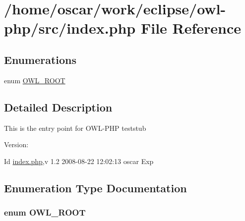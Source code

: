 \hypertarget{index_8php}{
\section{/home/oscar/work/eclipse/owl-php/src/index.php File Reference}
\label{index_8php}
}
\subsection*{Enumerations}
\begin{CompactItemize}
\item 
enum \hyperlink{index_8php_35612f9a6bd7277982731a74593272c4}{OWL\_\-ROOT} 
\end{CompactItemize}


\subsection{Detailed Description}
This is the entry point for OWL-PHP teststub \begin{Desc}
\item[Version:]\end{Desc}
\begin{Desc}
\item[Id]\hyperlink{index_8php}{index.php},v 1.2 2008-08-22 12:02:13 oscar Exp \end{Desc}


\subsection{Enumeration Type Documentation}
\hypertarget{index_8php_35612f9a6bd7277982731a74593272c4}{
\subsubsection{\setlength{\rightskip}{0pt plus 5cm}enum {\bf OWL\_\-ROOT}}}
\label{index_8php_35612f9a6bd7277982731a74593272c4}


